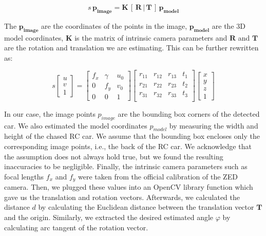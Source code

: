 \documentclass{ctuthesis/ctuthesis}
\begin{document}
\begin{equation}
s\,\mathbf{p_{image}} = \mathbf{K}\,[\,\mathbf{R}\, |\, \mathbf{T}\, ]\, \mathbf{p_{model}}
\end{equation}

The $\mathbf{p_{image}}$ are the coordinates of the points in the image, $\mathbf{p_{model}}$ are the 3D model coordinates, $\mathbf{K}$ is the matrix of intrinsic camera parameters and $\mathbf{R}$ and $\mathbf{T}$ are the rotation and translation we are estimating. This can be further rewritten as: \par


\begin{equation}
s\begin{bmatrix}u\\v\\1\end{bmatrix} = \begin{bmatrix}
f_x & \gamma & u_0\\
0 & f_y & v_0\\
0 & 0 & 1
\end{bmatrix}\begin{bmatrix}
r_{11} & r_{12} & r_{13} & t_{1}\\
r_{21} & r_{22} & r_{23} & t_{2}\\
r_{31} & r_{32} & r_{33} & t_{3}\\
\end{bmatrix}
\begin{bmatrix}x\\y\\z\\1\end{bmatrix}
\end{equation}

In our case, the image points $p_{image}$ are the bounding box corners of the detected car. We also estimated the model coordinates $p_{model}$ by measuring the width and height of the chased RC car. We assume that the bounding box encloses only the corresponding image points, i.e., the back of the RC car. We acknowledge that the assumption does not always hold true, but we found the resulting inaccuracies to be negligible. Finally, the intrinsic camera parameters such as focal lengths $f_x$ and $f_y$ were taken from the official calibration of the ZED camera. Then, we plugged these values into an OpenCV \cite{opencv_library} library function which gave us the translation and rotation vectors. Afterwards, we calculated the distance $d$ by calculating the Euclidean distance between the translation vector $\mathbf{T}$ and the origin. Similarly, we extracted the desired estimated angle $\varphi$ by calculating arc tangent of the rotation vector. 
\end{document}
